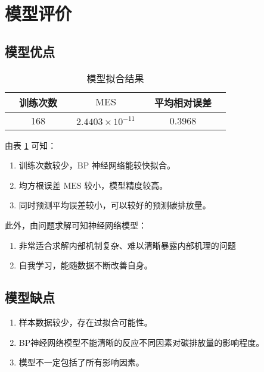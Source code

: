 \section{模型评价}

  \subsection{模型优点}

    \begin{table}[htb]
      \centering
      \caption{模型拟合结果}
      \begin{tabular*}{0.618\paperwidth}{@{\extracolsep{\fill}}ccccccc}
        \toprule[1.5pt]
        &训练次数 && $\mathrm{MES}$ && 平均相对误差 &\\
        \midrule[1pt]
        &168 && $2.4403\times 10^{-11}$ && 0.3968 &\\
        \bottomrule[1.5pt]
      \end{tabular*}
      \label{tab:nihejieguo}
    \end{table}

    由表 \ref{tab:nihejieguo} 可知：
    \begin{enumerate}
      \item 训练次数较少，$\mathrm{BP}$ 神经网络能较快拟合。
      \item 均方根误差 $\mathrm{MES}$ 较小，模型精度较高。
      \item 同时预测平均误差较小，可以较好的预测碳排放量。
    \end{enumerate}
    
    此外，由问题求解可知神经网络模型\cite{zhangfaming2016}：
    \begin{enumerate}
      \item 非常适合求解内部机制复杂、难以清晰暴露内部机理的问题
      \item 自我学习，能随数据不断改善自身。
    \end{enumerate}

  \subsection{模型缺点}
    \begin{enumerate}
      \item 样本数据较少，存在过拟合可能性。
      \item BP神经网络模型不能清晰的反应不同因素对碳排放量的影响程度。
      \item 模型不一定包括了所有影响因素。
    \end{enumerate}